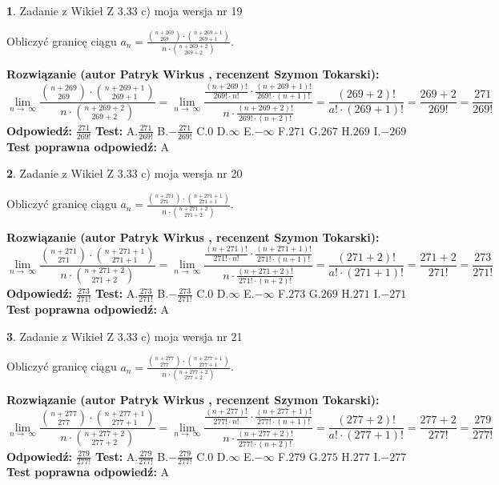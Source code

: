\documentclass[12pt, a4paper]{article}
\theoremstyle{definition} %
\newtheorem{zad}{}
\newcommand{\zadStart}[1]{\begin{zad}#1\newline}
\newcommand{\zadStop}{\end{zad}}
\newcommand{\rozwStart}[2]{\noindent \textbf{Rozwiązanie (autor #1 , recenzent #2): }\newline}
\newcommand{\rozwStop}{\newline}
\newcommand{\odpStart}{\noindent \textbf{Odpowiedź:}\newline}
\newcommand{\odpStop}{\newline}
\newcommand{\testStart}{\noindent \textbf{Test:}\newline}
\newcommand{\testStop}{\newline}
\newcommand{\kluczStart}{\noindent \textbf{Test poprawna odpowiedź:}\newline}
\newcommand{\kluczStop}{\newline}
\begin{document}
\zadStart{Zadanie z Wikieł Z 3.33 c) moja wersja nr 19}

Obliczyć granicę ciągu $a_{n}=\frac{{n+269\choose269}\cdot{n+269+1\choose269+1}}{n\cdot{n+269+2\choose269+2}}$.
\zadStop
\rozwStart{Patryk Wirkus}{Szymon Tokarski}
$$\lim\limits_{n\to\ \infty}\frac{{n+269\choose269}\cdot{n+269+1\choose269+1}}{n\cdot{n+269+2\choose269+2}} = \lim\limits_{n\to\ \infty}\frac{\frac{(n+269)!}{269! \cdot n!}\cdot \frac{(n+269+1)!}{269! \cdot (n+1)!}}{n\cdot \frac{(n+269+2)!}{269! \cdot (n+2)!}} = \frac{(269+2)!}{a!\cdot (269+1)!} = \frac{269+2}{269!} = \frac{271}{269!}$$
\rozwStop
\odpStart
$\frac{271}{269!}$
\odpStop
\testStart
A.$\frac{271}{269!}$ B.$-\frac{271}{269!}$ C.$0$ D.$\infty$ E.$-\infty$
F.$271$ G.$267$
H.$269$
I.$-269$
\testStop
\kluczStart
A
\kluczStop



\zadStart{Zadanie z Wikieł Z 3.33 c) moja wersja nr 20}

Obliczyć granicę ciągu $a_{n}=\frac{{n+271\choose271}\cdot{n+271+1\choose271+1}}{n\cdot{n+271+2\choose271+2}}$.
\zadStop
\rozwStart{Patryk Wirkus}{Szymon Tokarski}
$$\lim\limits_{n\to\ \infty}\frac{{n+271\choose271}\cdot{n+271+1\choose271+1}}{n\cdot{n+271+2\choose271+2}} = \lim\limits_{n\to\ \infty}\frac{\frac{(n+271)!}{271! \cdot n!}\cdot \frac{(n+271+1)!}{271! \cdot (n+1)!}}{n\cdot \frac{(n+271+2)!}{271! \cdot (n+2)!}} = \frac{(271+2)!}{a!\cdot (271+1)!} = \frac{271+2}{271!} = \frac{273}{271!}$$
\rozwStop
\odpStart
$\frac{273}{271!}$
\odpStop
\testStart
A.$\frac{273}{271!}$ B.$-\frac{273}{271!}$ C.$0$ D.$\infty$ E.$-\infty$
F.$273$ G.$269$
H.$271$
I.$-271$
\testStop
\kluczStart
A
\kluczStop



\zadStart{Zadanie z Wikieł Z 3.33 c) moja wersja nr 21}

Obliczyć granicę ciągu $a_{n}=\frac{{n+277\choose277}\cdot{n+277+1\choose277+1}}{n\cdot{n+277+2\choose277+2}}$.
\zadStop
\rozwStart{Patryk Wirkus}{Szymon Tokarski}
$$\lim\limits_{n\to\ \infty}\frac{{n+277\choose277}\cdot{n+277+1\choose277+1}}{n\cdot{n+277+2\choose277+2}} = \lim\limits_{n\to\ \infty}\frac{\frac{(n+277)!}{277! \cdot n!}\cdot \frac{(n+277+1)!}{277! \cdot (n+1)!}}{n\cdot \frac{(n+277+2)!}{277! \cdot (n+2)!}} = \frac{(277+2)!}{a!\cdot (277+1)!} = \frac{277+2}{277!} = \frac{279}{277!}$$
\rozwStop
\odpStart
$\frac{279}{277!}$
\odpStop
\testStart
A.$\frac{279}{277!}$ B.$-\frac{279}{277!}$ C.$0$ D.$\infty$ E.$-\infty$
F.$279$ G.$275$
H.$277$
I.$-277$
\testStop
\kluczStart
A
\kluczStop
\end{document}
